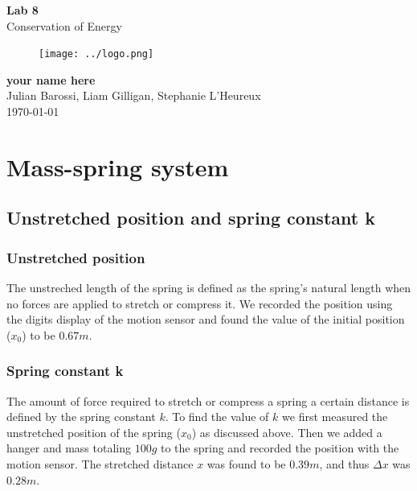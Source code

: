 \documentclass[11pt, letterpaper, includehead]{article}
\begin{document}
\begin{titlepage}
  \begin{center}
    \Huge{\textbf{Lab 8}}\\
    \Huge{Conservation of Energy}
    \vfill
    \begin{figure}[H] %
      \centering 
      \texttt{[image: ../logo.png]}
    \end{figure}
    \large{\textbf{your name here}}\\
    \large{Julian Barossi, Liam Gilligan, Stephanie L'Heureux}\\
    \vspace{0.5cm}
    \normalsize
    \today
  \end{center}
\end{titlepage}

\tableofcontents
\pagebreak %

\pagestyle{fancy}
\fancyhead{}

\section{Mass-spring system} %
\subsection{Unstretched position and spring constant k}
\subsubsection{Unstretched position}
The unstreched length of the spring is defined as the spring's natural length when no forces
are applied to stretch or compress it. We recorded the position using the digits display 
of the motion sensor and found the value of the initial position ($x_0$) to be $0.67m$.

\subsubsection{Spring constant k}
The amount of force required to stretch or compress a spring a certain distance is defined by the spring constant $k$.
To find the value of $k$ we first measured the unstretched position of the spring
($x_0$) as discussed above. Then we added a hanger and mass totaling $100g$ to the spring and recorded the position
with the motion sensor. The stretched distance $x$ was found to be $0.39m$, and thus $\Delta x$ was $0.28 m$.\\
\end{document}
